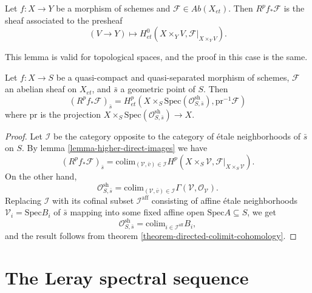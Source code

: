 \begin{lemma}
\label{lemma-higher-direct-images}
Let $f: X\to Y$ be a morphism of schemes and $\mathcal{F}\in
\textit{Ab}(X_{et})$. Then $R^pf_*\mathcal{F}$ is the sheaf associated to the
presheaf
$$
(V\to Y)\longmapsto H_{et}^0 \left(X\times_Y V,
\mathcal{F}|_{X\times_YV}\right).
$$
\end{lemma}

\noindent
This lemma is valid for topological spaces, and the proof in this case is the
same.

\begin{theorem}
\label{theorem-higher-direct-images}
Let $f: X\to S$ be a quasi-compact and quasi-separated morphism of schemes,
$\mathcal{F}$ an abelian sheaf on $X_{et}$, and $\bar s$ a geometric point of
$S$. Then
$$
\left(R^pf_* \mathcal{F}\right)_{\bar s} = H_{et}^p\left( X\times_S
\text{Spec}(\mathcal{O}_{S, \bar s}^\mathrm{sh}),
\text{pr}^{-1}\mathcal{F}\right)
$$
where $\text{pr}$ is the projection $X\times_S \text{Spec}(\mathcal{O}_{S,
\bar{s}}^\mathrm{sh}) \to X$.
\end{theorem}

\begin{proof}
Let $\mathcal{I}$ be the category opposite to the category of \'etale
neighborhoods of $\bar s$ on $S$. By lemma \ref{lemma-higher-direct-images}
we have
$$
\left(R^pf_*\mathcal{F}\right)_{\bar{s}} = \text{colim}_{(\mathcal{V},
\bar{v})\in \mathcal{I}} H^p(X\times_S\mathcal{V},
\mathcal{F}|_{X\times_S\mathcal{V}}).
$$
On the other hand,
$$
\mathcal{O}_{S, \bar{s}}^\mathrm{sh} = \text{colim}_{(\mathcal{V}, \bar v)\in
\mathcal{I}} \Gamma(\mathcal{V}, \mathcal{O}_\mathcal{V}).
$$
Replacing $\mathcal{I}$ with its cofinal subset $\mathcal{I}^\mathrm{aff}$
consisting of affine \'etale neighborhoods $\mathcal{V}_i= \text{Spec} B_i$ of
$\bar s$ mapping into some fixed affine open $\text{Spec} A \subseteq S$, we get
$$
\mathcal{O}_{S, \bar{s}}^\mathrm{sh} = \text{colim}_{i\in
\mathcal{I}^\mathrm{aff}} B_i,
$$
and the result follows from theorem \ref{theorem-directed-colimit-cohomology}.
\end{proof}





\section{The Leray spectral sequence}
\label{section-leray}

